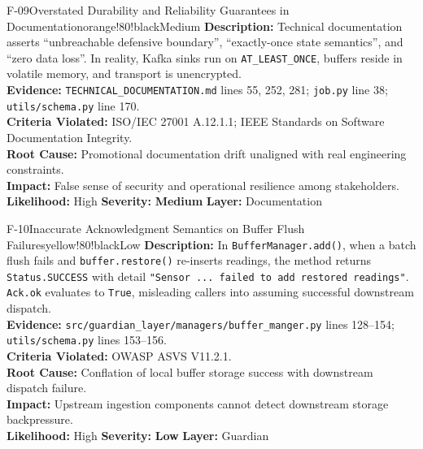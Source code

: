 \documentclass[10pt,a4paper]{report}
\begin{document}
\begin{findingbox}{F-09}{Overstated Durability and Reliability Guarantees in Documentation}{orange!80!black}{Medium}
\textbf{Description:} Technical documentation asserts ``unbreachable defensive boundary'', ``exactly-once state semantics'', and ``zero data loss''. In reality, Kafka sinks run on \texttt{AT\_LEAST\_ONCE}, buffers reside in volatile memory, and transport is unencrypted.\\
\textbf{Evidence:} \texttt{TECHNICAL\_DOCUMENTATION.md} lines 55, 252, 281; \texttt{job.py} line 38; \texttt{utils/schema.py} line 170.\\
\textbf{Criteria Violated:} ISO/IEC 27001 A.12.1.1; IEEE Standards on Software Documentation Integrity.\\
\textbf{Root Cause:} Promotional documentation drift unaligned with real engineering constraints.\\
\textbf{Impact:} False sense of security and operational resilience among stakeholders.\\
\textbf{Likelihood:} High \quad \textbar \quad \textbf{Severity:} \textbf{Medium} \quad \textbar \quad \textbf{Layer:} Documentation
\end{findingbox}

\begin{findingbox}{F-10}{Inaccurate Acknowledgment Semantics on Buffer Flush Failures}{yellow!80!black}{Low}
\textbf{Description:} In \texttt{BufferManager.add()}, when a batch flush fails and \texttt{buffer.restore()} re-inserts readings, the method returns \texttt{Status.SUCCESS} with detail \texttt{"Sensor ... failed to add restored readings"}. \texttt{Ack.ok} evaluates to \texttt{True}, misleading callers into assuming successful downstream dispatch.\\
\textbf{Evidence:} \texttt{src/guardian\_layer/managers/buffer\_manger.py} lines 128--154; \texttt{utils/schema.py} lines 153--156.\\
\textbf{Criteria Violated:} OWASP ASVS V11.2.1.\\
\textbf{Root Cause:} Conflation of local buffer storage success with downstream dispatch failure.\\
\textbf{Impact:} Upstream ingestion components cannot detect downstream storage backpressure.\\
\textbf{Likelihood:} High \quad \textbar \quad \textbf{Severity:} \textbf{Low} \quad \textbar \quad \textbf{Layer:} Guardian
\end{findingbox}
\end{document}

